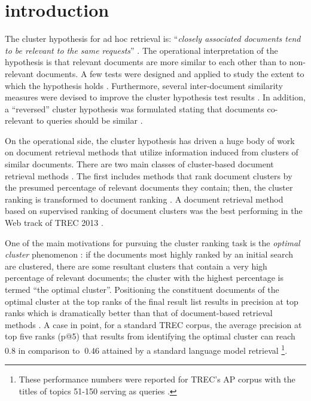 \section{introduction}
\label{sec:intro}

The cluster hypothesis for ad hoc retrieval is: ``{\em closely
associated documents tend to be relevant to the same requests}''
\cite{Jardine+Rijsbergen:71a}. The operational interpretation of the
hypothesis is that relevant documents are more similar to each
other than to non-relevant documents. A few tests were designed
and applied to study the extent to which the
hypothesis holds \cite{Jardine+Rijsbergen:71a,Voorhees:85a,elHamdouchi+Willett:87a,Crestani+Wu:06a,Smucker+Allan:09a,Raiber+Kurland:14c}. Furthermore,
several inter-document similarity measures were devised to improve
the cluster hypothesis test results
\cite{Tombros+Villa+Rijsbergen:02a,Raiber+al:15a}. In addition, a ``reversed''
cluster hypothesis was formulated stating that documents co-relevant to queries should be similar \cite{Fuhr+al:12a}.

On the operational side, the cluster hypothesis has driven a huge body of
work on document retrieval methods that utilize information induced
from clusters of similar documents. There are two main classes of
cluster-based document retrieval methods \cite{Kurland+Lee:04a}. The
first includes methods that rank document clusters by the presumed
percentage of relevant documents they contain; then, the cluster
ranking is transformed to document ranking
\cite{Jardine+Rijsbergen:71a,Croft:80a,Voorhees:85a,elHamdouchi+Willett:89a,Tombros+Villa+Rijsbergen:02a,Kurland+Lee:04a,Liu+Croft:04a,Kurland+Lee:06a,Liu+Croft:06a,Liu+Croft:06b,Liu+Croft:08a,Kurland+Domshlak:08a,Kurland+Krikon:11a,Raiber+Kurland:13a}. A
document retrieval method based on supervised ranking of document clusters was the best
performing in the Web track of TREC 2013 \cite{Thompson+al:13a}.

One of the main motivations for pursuing the cluster ranking task is
the {\em optimal cluster} phenomenon
\cite{Cutting+al:92a,Tombros+Villa+Rijsbergen:02a,Liu+Croft:06b,Kurland+Domshlak:08a}:
if the documents most highly ranked by an initial search are
clustered, there are some resultant clusters that contain a very high
percentage of relevant documents; the cluster with the highest percentage is termed ``the optimal cluster''. Positioning the
constituent documents of the optimal cluster at the top ranks of the
final result list results in precision at top ranks which is
dramatically better than that of document-based retrieval methods \cite{Tombros+Villa+Rijsbergen:02a,Liu+Croft:06b,Kurland+Domshlak:08a}. A
case in point, for a standard TREC corpus, the average precision at
top five ranks (p@5) that results from identifying the optimal cluster
can reach ~$0.8$ in comparison to $~0.46$ attained by a standard language model
retrieval \cite{Kurland+Domshlak:08a}\footnote{These performance numbers were reported for TREC's AP corpus with
  the titles of topics 51-150 serving as queries \cite{Kurland+Domshlak:08a}.}.

